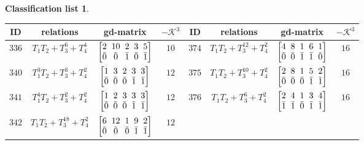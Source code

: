 \documentclass[10pt,a4paper]{amsart}
\theoremstyle{definition}
\newtheorem{class-list}[thm]{Classification list}
\numberwithin{equation}{section}
\begin{document}
\begin{class-list}
\begin{table}[h!]\centering\setlength{\tabcolsep}{3.5pt}
\renewcommand{\arraystretch}{1.3}\small\tabulinesep=1mm
\begin{tabu}{c|c|c|c||c|c|c|c}
\hline
ID&relations&gd-matrix&$-\mathcal{K}^3$&ID&relations&gd-matrix&$-\mathcal{K}^3$
\\
\hline
${336}$&${T_{1}T_{2}+T_{3}^{6}+T_{4}^{4}}$
&$\arraycolsep=1mm\begin{bmatrix}{2} & {10} & {2} & {3} & {5} \\ {\bar{0}} & {\bar{0}} & {\bar{1}} & {\bar{0}} & {\bar{1}}\end{bmatrix}$&${10}$
&${374}$&${T_{1}T_{2}+T_{3}^{12}+T_{4}^{2}}$
&$\arraycolsep=1mm\begin{bmatrix}{4} & {8} & {1} & {6} & {1} \\ {\bar{0}} & {\bar{0}} & {\bar{1}} & {\bar{1}} & {\bar{0}}\end{bmatrix}$&${16}$
\\
\hline
${340}$&${T_{1}^{3}T_{2}+T_{3}^{3}+T_{4}^{2}}$
&$\arraycolsep=1mm\begin{bmatrix}{1} & {3} & {2} & {3} & {3} \\ {\bar{0}} & {\bar{0}} & {\bar{0}} & {\bar{1}} & {\bar{1}}\end{bmatrix}$&${12}$
&${375}$&${T_{1}T_{2}+T_{3}^{10}+T_{4}^{2}}$
&$\arraycolsep=1mm\begin{bmatrix}{2} & {8} & {1} & {5} & {2} \\ {\bar{0}} & {\bar{0}} & {\bar{0}} & {\bar{1}} & {\bar{1}}\end{bmatrix}$&${16}$
\\
\hline
${341}$&${T_{1}^{4}T_{2}+T_{3}^{2}+T_{4}^{2}}$
&$\arraycolsep=1mm\begin{bmatrix}{1} & {2} & {3} & {3} & {3} \\ {\bar{0}} & {\bar{0}} & {\bar{0}} & {\bar{1}} & {\bar{1}}\end{bmatrix}$&${12}$
&${376}$&${T_{1}T_{2}+T_{3}^{6}+T_{4}^{2}}$
&$\arraycolsep=1mm\begin{bmatrix}{2} & {4} & {1} & {3} & {4} \\ {\bar{1}} & {\bar{1}} & {\bar{0}} & {\bar{1}} & {\bar{1}}\end{bmatrix}$&${16}$
\\
\hline
${342}$&${T_{1}T_{2}+T_{3}^{18}+T_{4}^{2}}$
&$\arraycolsep=1mm\begin{bmatrix}{6} & {12} & {1} & {9} & {2} \\ {\bar{0}} & {\bar{0}} & {\bar{0}} & {\bar{1}} & {\bar{1}}\end{bmatrix}$&${12}$

\end{tabu}
\end{table}
\end{class-list}
\end{document}
